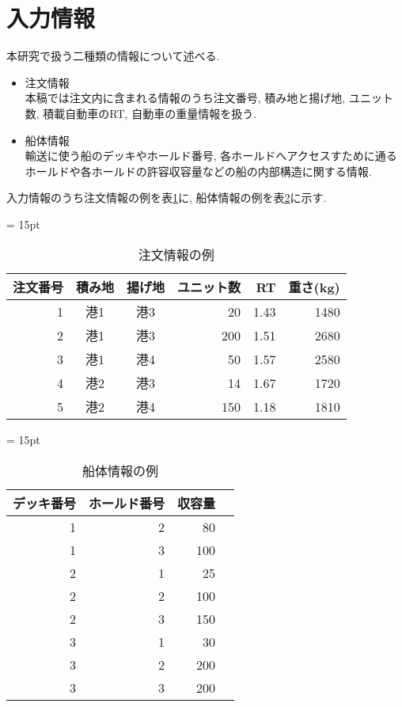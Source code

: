 \section{入力情報}
本研究で扱う二種類の情報について述べる.
\begin{itemize}

\item 注文情報 \\
本稿では注文内に含まれる情報のうち注文番号, 積み地と揚げ地, ユニット数, 積載自動車のRT, 自動車の重量情報を扱う.

\item 船体情報 \\
輸送に使う船のデッキやホールド番号, 各ホールドへアクセスすために通るホールドや各ホールドの許容収容量などの船の内部構造に関する情報.

\end{itemize}

入力情報のうち注文情報の例を表\ref{table21}に, 船体情報の例を表\ref{table22}に示す. \\

\begin{table}[htbp]
\tabcolsep = 15pt
\renewcommand{\arraystretch}{0.8}
\caption{注文情報の例}
\label{table21}
\begin{center}
\begin{tabular}{rccrrr} \hline
注文番号 & 積み地 & 揚げ地 & ユニット数 & RT & 重さ(kg) \\ \hline
1 & 港1 & 港3 & 20 & 1.43 & 1480 \\
2 & 港1 & 港3 & 200 & 1.51 & 2680 \\
3 & 港1 & 港4 & 50 & 1.57 & 2580 \\
4 & 港2 & 港3 & 14 & 1.67 & 1720 \\
5 & 港2 & 港4 & 150 & 1.18 & 1810 \\
\hline
\end{tabular}
\end{center}
\end{table}

\begin{table}[htbp]
\centering
\tabcolsep = 15pt
\renewcommand{\arraystretch}{0.8}
\caption{船体情報の例}
\label{table22}
\begin{center}
\begin{tabular}{rrrr} \hline
デッキ番号 & ホールド番号 & 収容量 \\ \hline
1 & 2 & 80  \\
1 & 3 & 100  \\
2 & 1 & 25  \\
2 & 2 & 100 \\
2 & 3 & 150  \\
3 & 1 & 30 \\
3 & 2 & 200 \\
3 & 3 & 200 \\
\hline
\end{tabular}
\end{center}
\end{table}

